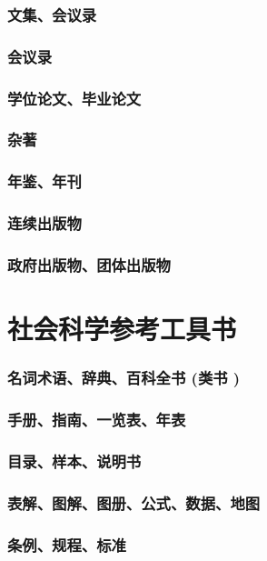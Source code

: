 \documentclass[UTF8]{../RepresentationUniverse}
\begin{document}
    \subsubsection{文集、会议录}
    \subsubsection{会议录}
    \subsubsection{学位论文、毕业论文}
    \subsubsection{杂著}
    \subsubsection{年鉴、年刊}
    \subsubsection{连续出版物}
    \subsubsection{政府出版物、团体出版物}

\section{社会科学参考工具书}
    \subsubsection{名词术语、辞典、百科全书 (类书 )}
    \subsubsection{手册、指南、一览表、年表}
    \subsubsection{目录、样本、说明书}
    \subsubsection{表解、图解、图册、公式、数据、地图}
    \subsubsection{条例、规程、标准}
\end{document}
